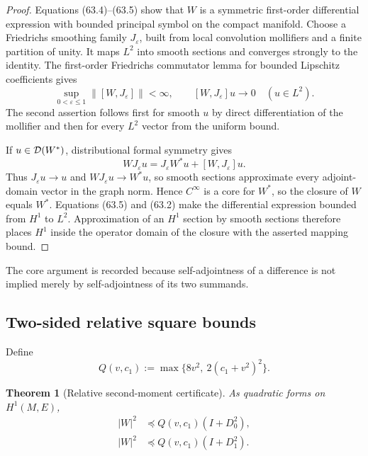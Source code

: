 \documentclass[11pt]{article}
\newtheorem{theorem}{Theorem}[section]
\theoremstyle{remark}
\begin{document}
\begin{proof}
Equations (63.4)--(63.5) show that \(W\) is a symmetric first-order
differential expression with bounded principal symbol on the compact
manifold.  Choose a Friedrichs smoothing family \(J_\varepsilon\), built from
local convolution mollifiers and a finite partition of unity.  It
maps \(L^2\) into smooth sections and converges strongly to the
identity.  The first-order Friedrichs commutator lemma for bounded
Lipschitz coefficients gives
\[
 \sup_{0<\varepsilon\leq1}\|[W,J_\varepsilon]\|<\infty,
 \qquad
 [W,J_\varepsilon]u\longrightarrow0
 \quad(u\in L^2).
\]
The second assertion follows first for smooth \(u\) by direct
differentiation of the mollifier and then for every \(L^2\) vector
from the uniform bound.

If \(u\in{\cal D}(W^*)\), distributional formal symmetry gives
\[
 WJ_\varepsilon u
 =
 J_\varepsilon W^*u+[W,J_\varepsilon]u.
\]
Thus \(J_\varepsilon u\to u\) and
\(WJ_\varepsilon u\to W^*u\), so smooth sections approximate every
adjoint-domain vector in the graph norm.  Hence
\(C^\infty\) is a core for \(W^*\), so the closure of \(W\) equals
\(W^*\).  Equations (63.5) and (63.2) make the differential expression
bounded from \(H^1\) to \(L^2\).  Approximation of an \(H^1\)
section by smooth sections therefore places \(H^1\) inside the
operator domain of the closure with the asserted mapping bound.
\end{proof}

The core argument is recorded because self-adjointness of a
difference is not implied merely by self-adjointness of its two
summands.

\subsection{Two-sided relative square bounds}

Define
\begin{equation}
 Q(v,c_1)
 :=
 \max\{8v^2,\ 2(c_1+v^2)^2\}.                    \tag{63.7}
\end{equation}

\begin{theorem}[Relative second-moment certificate]
\label{thm:v12v63-relative-square}
As quadratic forms on \(H^1(M,E)\),
\begin{align}
 |W|^2
 &\preceq
 Q(v,c_1)(I+D_0^2),                              \tag{63.8}\\
 |W|^2
 &\preceq
 Q(v,c_1)(I+D_1^2).                              \tag{63.9}
\end{align}
\end{theorem}
\end{document}
